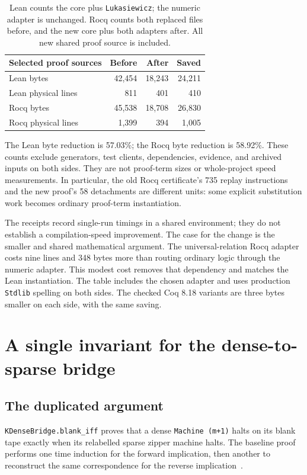 \documentclass[11pt]{article}
\newcommand{\RocqAfterBytes}{18,708}
\newcommand{\RocqAfterLines}{394}
\newcommand{\RocqSavedBytes}{26,830}
\begin{document}
\begin{table}[ht]
\centering
\begin{tabular}{lrrr}
\toprule
Selected proof sources & Before & After & Saved\\
\midrule
Lean bytes & 42,454 & 18,243 & 24,211\\
Lean physical lines & 811 & 401 & 410\\
Rocq bytes & 45,538 & \RocqAfterBytes & \RocqSavedBytes\\
Rocq physical lines & 1,399 & \RocqAfterLines & 1,005\\
\bottomrule
\end{tabular}
\caption{Lean counts the core plus \texttt{Lukasiewicz}; the numeric adapter is unchanged. Rocq counts both replaced files before, and the new core plus both adapters after. All new shared proof source is included.}
\label{tab:logic}
\end{table}

The Lean byte reduction is 57.03\%; the Rocq byte reduction is 58.92\%. These counts exclude generators, test clients, dependencies, evidence, and archived inputs on both sides. They are not proof-term sizes or whole-project speed measurements. In particular, the old Rocq certificate's 735 replay instructions and the new proof's 58 detachments are different units: some explicit substitution work becomes ordinary proof-term instantiation.

The receipts record single-run timings in a shared environment; they do not establish a compilation-speed improvement. The case for the change is the smaller and shared mathematical argument. The universal-relation Rocq adapter costs nine lines and 348 bytes more than routing ordinary logic through the numeric adapter. This modest cost removes that dependency and matches the Lean instantiation. The table includes the chosen adapter and uses production \texttt{Stdlib} spelling on both sides. The checked Coq 8.18 variants are three bytes smaller on each side, with the same saving.

\section{A single invariant for the dense-to-sparse bridge}

\subsection{The duplicated argument}

\texttt{KDenseBridge.blank\_iff} proves that a dense \texttt{Machine (m+1)} halts on its blank tape exactly when its relabelled sparse zipper machine halts. The baseline proof performs one time induction for the forward implication, then another to reconstruct the same correspondence for the reverse implication~\cite{densebridge}.
\end{document}

